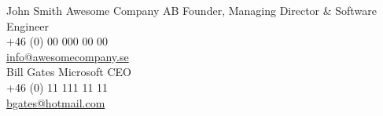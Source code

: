 \documentclass[]{thanos-cv}
\begin{document}
\begin{entrylist}
\entry
{}
{John Smith{}}
{Awesome Company AB}
{Founder, Managing Director \& Software Engineer\\
+46 (0) 00 000 00 00\\
\href{mailto:info@awesomecompany.se}{info@awesomecompany.se}\\
}
\entry
{}
{Bill Gates{}}
{Microsoft}
{CEO\\
+46 (0) 11 111 11 11\\
\href{mailto:bgates@hotmail.com}{bgates@hotmail.com}
}
\end{entrylist}
\end{document}
